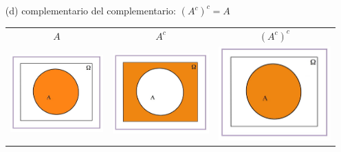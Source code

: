 \documentclass[handout]{beamer}\usepackage[]{graphicx}\usepackage[]{color}
\renewcommand{\emph}[1]{{\color{red}#1}}
\theoremstyle{plain}
\theoremstyle{definition}
\begin{document}
\begin{frame}

\begin{enumerate}
\item[(d)] \emph{complementario del complementario:} $(A^c)^c=A$
\medskip
\begin{center}
\begin{tabular}{ccc}
\hspace*{-1cm}  $A$ & $A^c$ & $(A^c)^c$\\
\hspace*{-1cm} \includegraphics[width=0.3\linewidth]{dd2.jpg} &
\includegraphics[width=0.3\linewidth]{dd1.jpg} &
\includegraphics[width=0.3\linewidth]{dd3.jpg}
\end{tabular}
\end{center}
\end{enumerate}

\end{frame}
\end{document}
